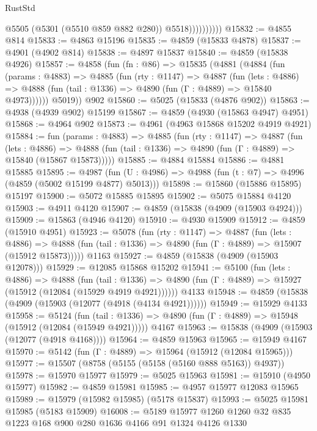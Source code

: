 \begin{lexlean}{RustStd}
\begin{coremodule}
                        @5505
                        (@5301 (@5510 @859 @882 @280))
                        @5518))))))))))
@15832 := @4855 @814
@15833 := @4863 @15196
@15835 := @4859 (@15833 @4878)
@15837 := @4901 (@4902 @814)
@15838 := @4897 @15837
@15840 := @4859 (@15838 @4926)
@15857 := @4858
    (fun (fn : @86) =>
    @15835
      (@4881
        (@4884
          (fun (params : @4883) =>
          @4885
            (fun (rty : @1147) =>
            @4887
              (fun (lets : @4886) =>
              @4888 (fun (tail : @1336) => @4890 (fun (Γ : @4889) => @15840 @4973))))))
        @5019))
    @902
@15860 := @5025 (@15833 (@4876 @902))
@15863 := @4938 (@4939 @902) @15199
@15867 := @4859 (@4930 (@15863 @4947) @4951)
@15868 := @4964 @902
@15873 := @4961 (@4963 @15868 @15202 @4919 @4921)
@15884 := fun (params : @4883) =>
  @4885
    (fun (rty : @1147) =>
    @4887
      (fun (lets : @4886) =>
      @4888 (fun (tail : @1336) => @4890 (fun (Γ : @4889) => @15840 (@15867 @15873)))))
@15885 := @4884 @15884
@15886 := @4881 @15885
@15895 := @4987
    (fun (U : @4986) => @4988 (fun (t : @7) => @4996 (@4859 (@5002 @15199 @4877) @5013)))
@15898 := @15860 (@15886 @15895) @15197
@15900 := @5072 @15885 @15895
@15902 := @5075 @15884 @4120
@15903 := @4911 @4120
@15907 := @4859 (@15838 (@4909 (@15903 @4924)))
@15909 := @15863 (@4946 @4120)
@15910 := @4930 @15909
@15912 := @4859 (@15910 @4951)
@15923 := @5078
    (fun (rty : @1147) =>
    @4887
      (fun (lets : @4886) =>
      @4888 (fun (tail : @1336) => @4890 (fun (Γ : @4889) => @15907 (@15912 @15873)))))
    @1163
@15927 := @4859 (@15838 (@4909 (@15903 @12078)))
@15929 := @12085 @15868 @15202
@15941 := @5100
    (fun (lets : @4886) =>
    @4888
      (fun (tail : @1336) =>
      @4890 (fun (Γ : @4889) => @15927 (@15912 (@12084 (@15929 @4919 @4921))))))
    @4133
@15948 := @4859 (@15838 (@4909 (@15903 (@12077 (@4918 (@4134 @4921))))))
@15949 := @15929 @4133
@15958 := @5124
    (fun (tail : @1336) => @4890 (fun (Γ : @4889) => @15948 (@15912 (@12084 (@15949 @4921)))))
    @4167
@15963 := @15838 (@4909 (@15903 (@12077 (@4918 @4168))))
@15964 := @4859 @15963
@15965 := @15949 @4167
@15970 := @5142 (fun (Γ : @4889) => @15964 (@15912 (@12084 @15965)))
@15977 := @15507 (@8758 (@5155 (@5158 (@5160 @888 @5163)) @4937))
@15978 := @15970 @15977
@15979 := @5025 @15963
@15981 := @15910 (@4950 @15977)
@15982 := @4859 @15981
@15985 := @4957 @15977 @12083 @15965
@15989 := @15979 (@15982 @15985) (@5178 @15837)
@15993 := @5025 @15981 @15985 (@5183 @15909)
@16008 := @5189 @15977 @1260 @1260 @32 @835 @1223 @168 @900 @280 @1636 @4166 @91 @1324 @4126 @1330

\end{coremodule}
\end{lexlean}
